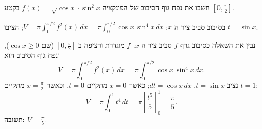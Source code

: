 
\begin{question}
חשבו את נפח גוף הסיבוב של הפונקציה $f(x) = \sqrt{\cos x} \cdot \sin^2 x$ בקטע $[0, \frac{\pi}{2}]$.
\end{question}

\begin{hint}
בסיבוב סביב ציר ה-$x$: $V = \pi\int_0^{\pi/2} f^2(x)\,dx = \pi\int_0^{\pi/2}\cos x\,\sin^4 x\,dx$; הציבו $t = \sin x$.
\end{hint}

\begin{solution}
נבין את השאלה כסיבוב גרף $f$ סביב ציר ה-$x$. $f$ מוגדרת ורציפה ב-$[0, \frac{\pi}{2}]$ (שם $\cos x \ge 0$), ונפח גוף הסיבוב הוא
\[ V = \pi\int_0^{\pi/2} f^2(x)\,dx = \pi\int_0^{\pi/2} \cos x\,\sin^4 x\,dx. \]
נציב $t = \sin x$, $dt = \cos x\,dx$; כאשר $x = 0$ מתקיים $t = 0$, וכאשר $x = \frac{\pi}{2}$ מתקיים $t = 1$:
\[ V = \pi\int_0^1 t^4\,dt = \pi\left[\frac{t^5}{5}\right]_0^1 = \frac{\pi}{5}. \]
\textbf{תשובה:} $\boxed{V = \frac{\pi}{5}}$.
\end{solution}
